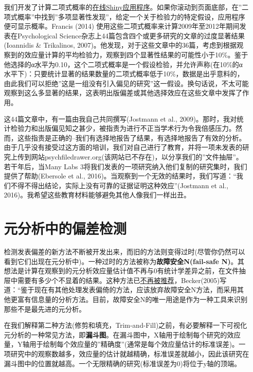 \documentclass[
  letterpaper,
  DIV=11,
  numbers=noendperiod]{scrreprt}
\begin{document}
我们开发了计算二项式概率的\href{http://shiny.ieis.tue.nl/mixed_results_likelihood/}{在线Shiny应用程序}。如果你滚动到页面底部，在''二项式概率''中找到''多项显著性发现''，给定一个关于检验力的特定假设，应用程序便可显示概率。Francis
(2014) 使用这些二项式概率来计算2009年至2012年期间发表在Psychological
Science杂志上44篇包含四个或更多研究的文章的过度显著结果(Ioannidis \&
Trikalinos,
2007)。他发现，对于这些文章中的36篇，考虑到根据观察到的效应量计算的平均检验力，观察到四个显著性结果的可能性小于10\%。鉴于他选择的α水平为0.10，这个二项式概率是一个假设检验，并允许声称(在10\%的α水平下)：只要统计显著的结果数量的二项式概率低于10\%，数据是出乎意料的，由此我们可以拒绝''这是一组没有引入偏见的研究''这一假设。换句话说，不太可能观察到这么多显著的结果，这表明出版偏差或其他选择效应在这些文章中发挥了作用。

这44篇文章中，有一篇由我自己共同撰写(Jostmann et al.,
2009)。那时，我对统计检验力和出版偏见知之甚少，被指责为进行不正当学术行为令我倍感压力。然而，这些指责是正确的--我们有选择地报告了结果，有选择地报告了有效的分析。由于几乎没有接受过这方面的培训，我们对自己进行了教育，并将一项未发表的研究上传到网站psychfiledrawer.org(该网站已不存在)，以分享我们的''文件抽屉''。若干年后，当Many
Labs
3将我们发表的一项研究纳入他们复制的研究集时，我们提供了帮助(Ebersole et
al.,
2016)。当观察到一个无效的结果时，我们写道：``我们不得不得出结论，实际上没有可靠的证据证明这种效应''(Jostmann
et al., 2016)。我希望这些教育材料能够避免其他人像我们一样出丑。

\hypertarget{ux5143ux5206ux6790ux4e2dux7684ux504fux5deeux68c0ux6d4b}{%
\section{元分析中的偏差检测}\label{ux5143ux5206ux6790ux4e2dux7684ux504fux5deeux68c0ux6d4b}}

检测发表偏差的新方法不断被开发出来，而旧的方法则变得过时(尽管你仍然可以看到它们出现在元分析中)。一种过时的方法被称为\textbf{故障安全N(fail-safe
N)}。其想法是计算在观察到的元分析效应量估计值不再与0有统计学差异之前，在文件抽屉中需要有多少个不显着的结果。这种方法已\href{https://handbook-5-1.cochrane.org/chapter_10/10_4_4_3_fail_safe_n.htm}{不再被推荐}，Becker(2005)写道：``鉴于现在有其他处理发表偏倚的方法，应该放弃故障安全N方法，而采用其他更富有信息量的分析方法。目前，故障安全N的唯一用途是作为一种工具来识别那些不是最先进的元分析。

在我们解释第二种方法(修剪和填充，Trim-and-Fill)之前，有必要解释一下可视化元分析的一种常见方法，即\textbf{漏斗图}。在漏斗图中，X轴用于绘制每个研究的效应量，Y轴用于绘制每个效应量的''精确度''(通常是每个效应量估计的标准误差)。一项研究中的观察数越多，效应量的估计就越精确，标准误差就越小，因此该研究在漏斗图中的位置就越高。一个无限精确的研究(标准误差为0)将位于y轴的顶端。
\end{document}

